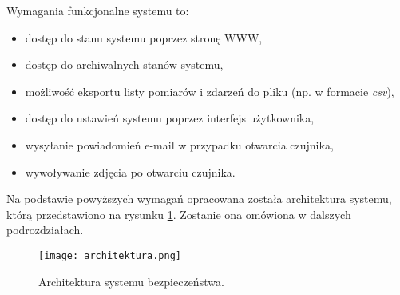 \documentclass[a4paper,11pt,twoside]{article}
\begin{document}
Wymagania funkcjonalne systemu to:
\begin{itemize}
\item dostęp do stanu systemu poprzez stronę WWW,
\item dostęp do archiwalnych stanów systemu,
\item możliwość eksportu listy pomiarów i zdarzeń do pliku (np. w formacie \textit{csv}),
\item dostęp do ustawień systemu poprzez interfejs użytkownika,
\item wysyłanie powiadomień e-mail w przypadku otwarcia czujnika,
\item wywoływanie zdjęcia po otwarciu czujnika.
\end{itemize}

Na podstawie powyższych wymagań opracowana została architektura systemu, którą przedstawiono na rysunku \ref{fig: architektura}. Zostanie ona omówiona w dalszych podrozdziałach.
\begin{figure}[h]
\texttt{[image: architektura.png]}
\caption{Architektura systemu bezpieczeństwa.}
\label{fig: architektura}
\end{figure}
\end{document}

